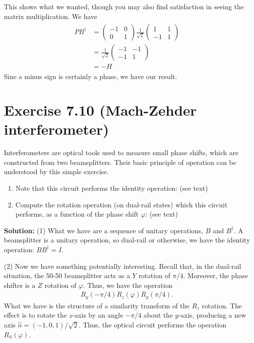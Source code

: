 \documentclass{book}
\begin{document}
    This shows what we wanted, though you may also find satisfaction in seeing the matrix multiplication. We have
    \begin{align}
    \begin{aligned}
        P B^\dagger &= \begin{pmatrix}
            -1 & 0 \\
            0 & 1
        \end{pmatrix} \frac{1}{\sqrt{2}} \begin{pmatrix}
            1 & 1 \\
            -1 & 1
        \end{pmatrix} \\[1.5ex]
        &= \frac{1}{\sqrt{2}} \begin{pmatrix}
            -1 & -1 \\
            -1 & 1
        \end{pmatrix} \\
        &= - H
    \end{aligned}
    \end{align}
    Sine a minus sign is certainly a phase, we have our result.

\section*{Exercise 7.10 (Mach-Zehder interferometer)}
    Interferometers are optical tools used to measure small phase shifts, which are constructed from two beamsplitters. Their basic principle of operation can be understood by this simple exercise.
    \begin{enumerate}
        \item Note that this circuit performs the identity operation: (see text)
        \item Compute the rotation operation (on dual-rail states) which this circuit performs, as a function of the phase shift $\varphi$: (see text)
    \end{enumerate}
    
    \textbf{Solution:} (1) What we have are a sequence of unitary operations, $B$ and $B^\dagger$. A beamsplitter is a unitary operation, so dual-rail or otherwise, we have the identity operation: $BB^\dagger = I$.

    (2) Now we have something potentially interesting. Recall that, in the dual-rail situation, the 50-50 beamsplitter acts as a $Y$ rotation of $\pi/4$. Moreover, the phase shifter is a $Z$ rotation of $\varphi$. Thus, we have the operation
    \begin{align} \label{eq:7.10}
        R_y(-\pi/4) R_z(\varphi) R_y(\pi/4).
    \end{align}
    What we have is the structure of a similarity transform of the $R_z$ rotation. The effect is to rotate the $z$-axis by an angle $-\pi/4$ about the $y$-axis, producing a new axis $\hat{n} = (-1,0,1)/\sqrt{2}$. Thus, the optical circuit performs the operation $R_{\hat{n}}(\varphi)$.
\end{document}
